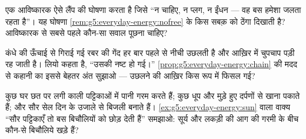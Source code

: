 \begin{exercise}[$\star\star$]\label{exo:g5:everyday-energy:9}
एक आविष्कारक ऐसे लैंप की घोषणा करता है जिसे ``न  चाहिए, न प्लग,
न ईंधन --- वह बस हमेशा जलता रहता है''। यह घोषणा
\cref{rem:g5:everyday-energy:nofree} के किस सबक़ को ठेंगा दिखाती है?
आविष्कारक से सबसे पहले कौन-सा सवाल पूछना चाहिए?
\end{exercise}

\begin{exercise}[$\star\star$]\label{exo:g5:everyday-energy:10}
कंधे की ऊँचाई से गिराई गई रबर की गेंद हर बार पहले से नीची उछलती है
और आख़िर में चुपचाप पड़ी रह जाती है। लियो कहता है, ``उसकी  नष्ट
हो गई।'' \cref{prop:g5:everyday-energy:chain} की मदद से कहानी का
इससे बेहतर अंत सुझाओ --- उछलने की  आख़िर किस रूप में फिसल गई?
\end{exercise}

\begin{exercise}[$\star\star$]\label{exo:g5:everyday-energy:11}
कुछ घर छत पर लगी काली पट्टिकाओं में पानी गरम करते हैं; कुछ धूप और
मुड़े हुए दर्पणों से खाना पकाते हैं; और सौर सेल दिन के उजाले से बिजली
बनाते हैं। \cref{ex:g5:everyday-energy:sun} वाला वाक्य ``सौर
पट्टिकाएँ तो बस बिचौलियों को छोड़ देती हैं'' समझाओ: सूर्य और लकड़ी की
आग की गरमी के बीच कौन-से बिचौलिये खड़े हैं?
\end{exercise}
